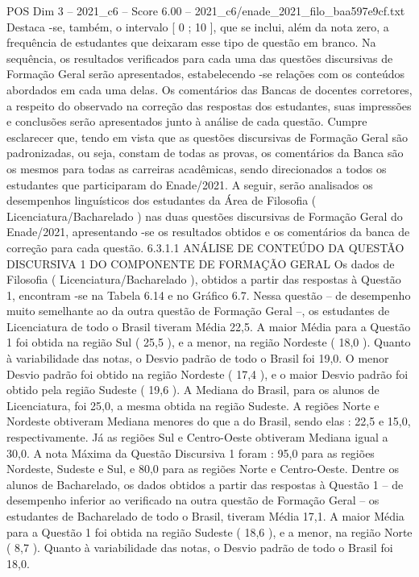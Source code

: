 \begin{textsample}{POS Dim 3 – 2021\_c6 – Score 6.00 – 2021\_c6/enade\_2021\_filo\_baa597e9cf.txt}
Destaca -se, também, o intervalo [ 0 ; 10 ], que se inclui, além da nota zero, a frequência de estudantes que deixaram esse tipo de questão em branco.
Na sequência, os resultados verificados para cada uma das questões discursivas de Formação Geral serão apresentados, estabelecendo -se relações com os conteúdos abordados em cada uma delas.
Os comentários das Bancas de docentes corretores, a respeito do observado na correção das respostas dos estudantes, suas impressões e conclusões serão apresentados junto à análise de cada questão.
Cumpre esclarecer que, tendo em vista que as questões discursivas de Formação Geral são padronizadas, ou seja, constam de todas as provas, os comentários da Banca são os mesmos para todas as carreiras acadêmicas, sendo direcionados a todos os estudantes que participaram do Enade/2021.
A seguir, serão analisados os desempenhos linguísticos dos estudantes da Área de Filosofia ( Licenciatura/Bacharelado ) nas duas questões discursivas de Formação Geral do Enade/2021, apresentando -se os resultados obtidos e os comentários da banca de correção para cada questão. 6.3.1.1 ANÁLISE DE CONTEÚDO DA QUESTÃO DISCURSIVA 1 DO COMPONENTE DE FORMAÇÃO GERAL Os dados de Filosofia ( Licenciatura/Bacharelado ), obtidos a partir das respostas à Questão 1, encontram -se na Tabela 6.14 e no Gráfico 6.7.
Nessa questão – de desempenho muito semelhante ao da outra questão de Formação Geral –, os estudantes de Licenciatura de todo o Brasil tiveram Média 22,5.
A maior Média para a Questão 1 foi obtida na região Sul ( 25,5 ), e a menor, na região Nordeste ( 18,0 ).
Quanto à variabilidade das notas, o Desvio padrão de todo o Brasil foi 19,0.
O menor Desvio padrão foi obtido na região Nordeste ( 17,4 ), e o maior Desvio padrão foi obtido pela região Sudeste ( 19,6 ).
A Mediana do Brasil, para os alunos de Licenciatura, foi 25,0, a mesma obtida na região Sudeste.
A regiões Norte e Nordeste obtiveram Mediana menores do que a do Brasil, sendo elas : 22,5 e 15,0, respectivamente.
Já as regiões Sul e Centro-Oeste obtiveram Mediana igual a 30,0.
A nota Máxima da Questão Discursiva 1 foram : 95,0 para as regiões Nordeste, Sudeste e Sul, e 80,0 para as regiões Norte e Centro-Oeste.
Dentre os alunos de Bacharelado, os dados obtidos a partir das respostas à Questão 1 – de desempenho inferior ao verificado na outra questão de Formação Geral – os estudantes de Bacharelado de todo o Brasil, tiveram Média 17,1.
A maior Média para a Questão 1 foi obtida na região Sudeste ( 18,6 ), e a menor, na região Norte ( 8,7 ).
Quanto à variabilidade das notas, o Desvio padrão de todo o Brasil foi 18,0.

\end{textsample}
